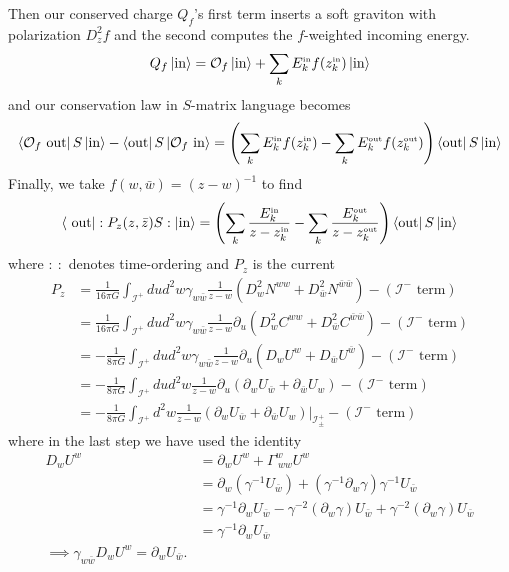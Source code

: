 \documentclass[11pt,letterpaper]{article}
\newcommand{\LP}{\left(}
\newcommand{\RP}{\right)}
\newcommand{\mc}[1]{\mathcal{#1}}
\newcommand{\D}{\partial}
\newcommand{\KET}[1]{\left| #1 \right\rangle }
\newcommand{\BRA}[1]{\left\langle #1 \right| }
\begin{document}
Then our conserved charge $Q_f$'s first term inserts a soft graviton with polarization $D_z^2 f$ and the second computes the $f$-weighted incoming energy. \begin{equation}
Q_f \KET{\mbox{in}} = \mc{O}_f \KET{\mbox{in}} + \sum_k E^{\mbox{\tiny{in}}}_k f(z^{\mbox{\tiny{in}}}_k) \KET{\mbox{in}}
\end{equation}
and our conservation law in $S$-matrix language becomes \begin{equation}
\BRA{\mc{O}_f \mbox{ out}} S \KET{\mbox{in}} - \BRA{\mbox{out}} S \KET{\mc{O}_f \mbox{ in}} = \LP \sum_k E^{\mbox{\tiny{in}}}_k f(z^{\mbox{\tiny{in}}}_k) - \sum_k E^{\mbox{\tiny{out}}}_k f(z^{\mbox{\tiny{out}}}_k) \RP \BRA{\mbox{out}} S \KET{\mbox{in}}
\end{equation}
Finally, we take $f(w, \bar{w}) = (z - w)^{-1}$ to find \begin{equation}
\BRA{\mbox{ out}} : P_z(z, \bar{z}) S: \KET{\mbox{in}} = \LP \sum_k \frac{E^{\mbox{\tiny{in}}}_k }{z - z^{\mbox{\tiny{in}}}_k} - \sum_k \frac{E^{\mbox{\tiny{out}}}_k}{z - z^{\mbox{\tiny{out}}}_k} \RP \BRA{\mbox{out}} S \KET{\mbox{in}}
\end{equation}
where $: \ :$ denotes time-ordering and $P_z$ is the current \begin{equation}
\begin{aligned}
P_z & = \frac{1}{16 \pi G} \int_{\mc{I}^+} du d^2 w \gamma_{w \bar{w}} \frac{1}{z - w} \LP D_w^2 N^{ww} + D_{\bar{w}}^2 N^{\bar{w} \bar{w}} \RP - \LP \mc{I}^- \mbox{ term} \RP \\
& = \frac{1}{16 \pi G} \int_{\mc{I}^+} du d^2 w \gamma_{w \bar{w}} \frac{1}{z - w} \D_u \LP D_w^2  C^{ww} + D_{\bar{w}}^2  C^{\bar{w} \bar{w}} \RP - \LP \mc{I}^- \mbox{ term} \RP \\
& = -\frac{1}{8 \pi G} \int_{\mc{I}^+} du d^2 w \gamma_{w \bar{w}} \frac{1}{z - w} \D_u \LP D_w  U^w + D_{\bar{w}}  U^{\bar{w}} \RP - \LP \mc{I}^- \mbox{ term} \RP \\
& = -\frac{1}{8 \pi G} \int_{\mc{I}^+} du d^2 w \frac{1}{z - w} \D_u \LP \D_w  U_{\bar{w}} + \D_{\bar{w}}  U_w \RP - \LP \mc{I}^- \mbox{ term} \RP \\
& = -\frac{1}{8 \pi G} \int_{\mc{I}^+} d^2 w \frac{1}{z - w} \left. \LP \D_w  U_{\bar{w}} + \D_{\bar{w}}  U_w \RP \right|_{\mc{I}^+_\pm} - \LP \mc{I}^- \mbox{ term} \RP
\end{aligned}
\end{equation}
where in the last step we have used the identity \begin{equation}
\begin{aligned}
 D_w U^w & = \D_w U^w + \Gamma^w_{ \ w w} U^w \\
 & = \D_w \LP \gamma^{-1} U_{\bar{w}} \RP + \LP \gamma^{-1} \D_w \gamma \RP \gamma^{-1} U_{\bar{w}} \\
 & = \gamma^{-1} \D_w U_{\bar{w}} - \gamma^{-2} \LP \D_w \gamma \RP U_{\bar{w}} + \gamma^{-2} \LP \D_w \gamma \RP U_{\bar{w}} \\
 & = \gamma^{-1} \D_w U_{\bar{w}} \\
 \implies \gamma_{w \bar{w}} D_w U^w = \D_w U_{\bar{w}}.
\end{aligned}
\end{equation}
\end{document}
